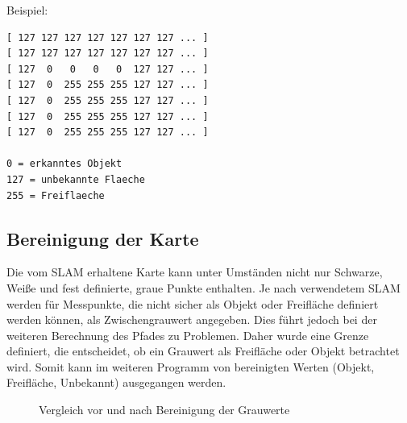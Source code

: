 Beispiel: 
\begin{lstlisting}
[ 127 127 127 127 127 127 127 ... ]
[ 127 127 127 127 127 127 127 ... ]
[ 127  0   0   0   0  127 127 ... ]
[ 127  0  255 255 255 127 127 ... ]
[ 127  0  255 255 255 127 127 ... ]
[ 127  0  255 255 255 127 127 ... ]
[ 127  0  255 255 255 127 127 ... ]

0 = erkanntes Objekt
127 = unbekannte Flaeche
255 = Freiflaeche
\end{lstlisting}


\subsection{Bereinigung der Karte}

Die vom SLAM erhaltene Karte kann unter Umständen nicht nur Schwarze, Weiße und fest definierte, graue Punkte enthalten. Je nach verwendetem SLAM werden für Messpunkte, die nicht sicher als Objekt oder Freifläche definiert werden können, als Zwischengrauwert angegeben. Dies führt jedoch bei der weiteren Berechnung des Pfades zu Problemen. Daher wurde eine Grenze definiert, die entscheidet, ob ein Grauwert als Freifläche oder Objekt betrachtet wird. Somit kann im weiteren Programm von bereinigten Werten (Objekt, Freifläche, Unbekannt) ausgegangen werden. 

\begin{figure}
\caption{Vergleich vor und nach Bereinigung der Grauwerte}
\label{fig:ungenaueKarte}
\end{figure}


